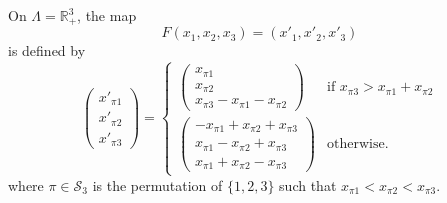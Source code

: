 On $\Lambda=\mathbb{R}^3_+$, the map
\[
F (x_1,x_2,x_3) = (x'_1,x'_2,x'_3)
\]
is defined by
\[
\left(\begin{array}{r}
	x'_{\pi 1} \\
	x'_{\pi 2} \\
	x'_{\pi 3}
\end{array}\right) =
\begin{cases}
\left(\begin{array}{l}
    x_{\pi 1}\\
    x_{\pi 2}\\
    x_{\pi 3}-x_{\pi 1}-x_{\pi 2}
\end{array}\right)
    &\mbox{if } x_{\pi 3}>x_{\pi 1}+x_{\pi 2}\\
\left(\begin{array}{r}
     -x_{\pi 1}+x_{\pi 2}+x_{\pi 3}\\
      x_{\pi 1}-x_{\pi 2}+x_{\pi 3}\\
      x_{\pi 1}+x_{\pi 2}-x_{\pi 3}
\end{array}\right)
     &\mbox{otherwise.}
\end{cases}
\]
where $\pi\in\mathcal{S}_3$ is the permutation of $\{1,2,3\}$ such that
$x_{\pi 1}<x_{\pi 2}<x_{\pi 3}$.
